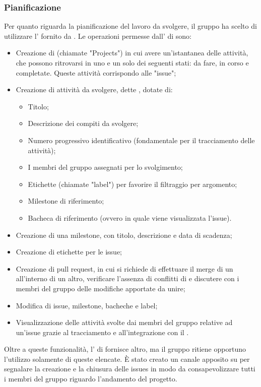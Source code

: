 \subsubsection{Pianificazione}
Per quanto riguarda la pianificazione del lavoro da svolgere, il gruppo \Gruppo{} ha scelto di utilizzare l' fornito da .
Le operazioni permesse dall' di  sono:
\begin{itemize}
	\item Creazione di  (chiamate "Projects") in cui avere un'istantanea delle attività, che possono ritrovarsi in uno e un solo dei seguenti stati: da fare, in corso e completate. Queste attività corrispondo alle "issue";
	\item Creazione di attività da svolgere, dette , dotate di:
	\begin{itemize}
		\item Titolo;
		\item Descrizione dei compiti da svolgere;
		\item Numero progressivo identificativo (fondamentale per il tracciamento delle attività);
		\item I membri del gruppo assegnati per lo svolgimento;
		\item Etichette (chiamate "label") per favorire il filtraggio per argomento;
		\item Milestone di riferimento;
		\item Bacheca di riferimento (ovvero in quale  viene visualizzata l'issue).
	\end{itemize}
	\item Creazione di una milestone, con titolo, descrizione e data di scadenza;
	\item Creazione di etichette per le issue;
	\item Creazione di pull request, in cui si richiede di effettuare il merge di un  all'interno di un altro, verificare l'assenza di conflitti di  e discutere con i membri del gruppo delle modifiche apportate da unire;
	\item Modifica di issue, milestone, bacheche e label;
	\item Visualizzazione delle attività svolte dai membri del gruppo relative ad un'issue grazie al tracciamento e all'integrazione con il  .
\end{itemize}
Oltre a queste funzionalità, l' di  fornisce altro, ma il gruppo \Gruppo{} ritiene opportuno l'utilizzo solamente di queste elencate.
È stato creato un canale apposito su  per segnalare la creazione e la chiusura delle issues in modo da consapevolizzare tutti i membri del gruppo riguardo l'andamento del progetto.

